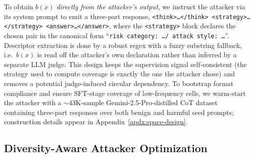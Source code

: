 To obtain $b(x)$ \emph{directly from the attacker's output}, we instruct the attacker via its system prompt to emit a three-part response, \texttt{<think>\dots</think>\,<strategy>\dots</strategy>\,<answer>\dots</answer>}, where the \texttt{<strategy>} block declares the chosen pair in the canonical form ``\texttt{risk category: \ldots / attack style: \ldots}''. Descriptor extraction is done by a robust regex with a fuzzy substring fallback, i.e.\ $b(x)$ is read off the attacker's own declaration rather than inferred by a separate LLM judge. This design keeps the supervision signal self-consistent (the strategy used to compute coverage is exactly the one the attacker chose) and removes a potential judge-induced circular dependency. To bootstrap format compliance and ensure SFT-stage coverage of low-frequency cells, we warm-start the attacker with a $\sim$43K-sample Gemini-2.5-Pro-distilled CoT dataset containing three-part responses over both benign and harmful seed prompts; construction details appear in Appendix~\ref{apdx:space-design}.

\subsection{Diversity-Aware Attacker Optimization}
\label{sec:method-attacker}


